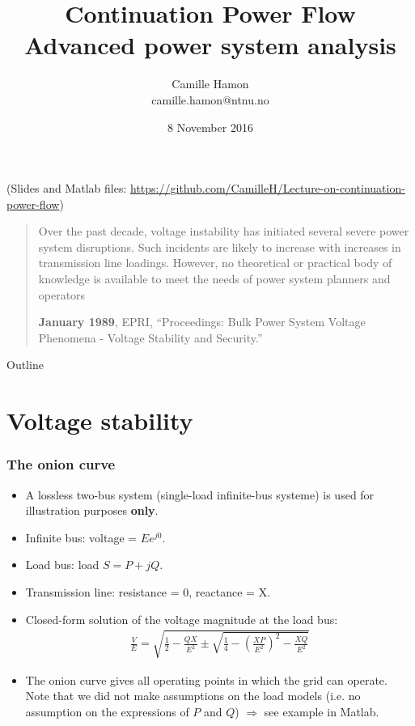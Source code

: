 \documentclass{beamer}
\title{Continuation Power Flow\\Advanced power system analysis}
\author{Camille Hamon\\camille.hamon@ntnu.no}
\date{8 November 2016}
\begin{document}
\begin{frame}[plain]
  \titlepage
{\footnotesize (Slides and Matlab files: \url{https://github.com/CamilleH/Lecture-on-continuation-power-flow})}
\end{frame}

\begin{frame}[plain]
\blockquote[\textbf{January 1989}, EPRI, “Proceedings: Bulk Power System Voltage Phenomena - Voltage Stability and Security.”]{Over the past decade, voltage instability has initiated several severe power system disruptions. Such incidents are likely to increase with increases in transmission line loadings. However, no theoretical or practical body of knowledge is available to meet the needs of power system planners and operators}  
\end{frame}

\begin{frame}{Outline}
  \tableofcontents[subsectionstyle=hide]
\end{frame}

\section[Volt. Stab.]{Voltage stability}
\begin{frame}
  \frametitle{The onion curve}
  \begin{itemize}
\item A lossless two-bus system (single-load infinite-bus systeme) is used for illustration purposes \textbf{only}.
\item Infinite bus: voltage = $Ee^{j0}$.
\item Load bus: load $S = P+jQ$.
\item Transmission line: resistance = 0, reactance = X.
\item Closed-form solution of the voltage magnitude at the load bus:
  \begin{align*}
    \frac{V}{E} = \sqrt{\frac{1}{2}-\frac{QX}{E^2} \pm \sqrt{\frac{1}{4}-\left( \frac{XP}{E^2} \right)^2 - \frac{XQ}{E^2}}}
  \end{align*}
\item The onion curve gives all operating points in which the grid can operate. Note that we did not make assumptions on the load models (i.e. no assumption on the expressions of $P$ and $Q$) $\Rightarrow$ see example in Matlab.
  \end{itemize}
\end{frame}
\end{document}
